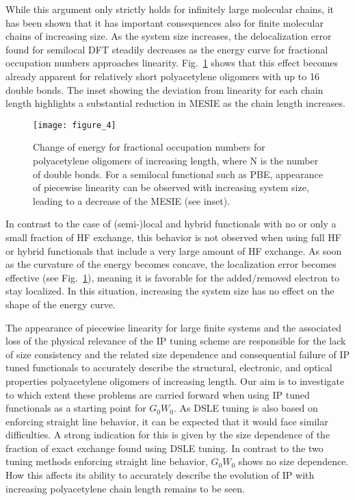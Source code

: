\documentclass[journal=jctcce,manuscript=article,layout=twocolumn]{achemso}
\begin{document}
While this argument only strictly holds for infinitely large molecular chains, it has been shown that it has important consequences also for finite molecular chains of increasing size. As the system size increases, the delocalization
error found for semilocal DFT steadily decreases as the energy curve for fractional occupation numbers approaches linearity.\cite{phys_rev_let_2008_piecewise_linearity_finite_infinite,jcp_2015_piecewise_linearity_solid_state_finite}  Fig.~\ref{MESIE_frac} shows that this effect becomes already apparent for 
relatively short polyacetylene oligomers with up to 16 double bonds. The inset showing the deviation from linearity for each chain length highlights a substantial reduction in MESIE as the chain length increases.
\begin{figure}[tb]
\texttt{[image: figure\_4]}
\caption{Change of energy for fractional occupation numbers for polyacetylene oligomers of increasing length, where N is the number of double bonds. For a semilocal functional such as PBE, appearance of piecewise
linearity can be observed with increasing system size, leading to a decrease of the MESIE (see inset).\label{MESIE_frac}}
\end{figure}
In contrast to the case of (semi-)local and hybrid functionals with no or only a small fraction of HF exchange, this behavior is not observed when using full HF or hybrid functionals that include a very large amount of HF exchange. As soon as the curvature of the energy becomes concave, the localization error becomes effective (see Fig.~\ref{MESIE_frac}), meaning it is favorable for the added/removed electron to stay localized. In this situation, increasing the system size has no effect on the shape of the energy curve.\cite{phys_rev_let_2008_piecewise_linearity_finite_infinite}

The appearance of piecewise linearity for large finite systems and the associated loss of the physical relevance of the IP tuning scheme are responsible for the lack of size consistency and the related size dependence and consequential
failure of IP tuned functionals to accurately describe the structural, electronic, and optical properties polyacetylene oligomers of increasing length. Our aim is to investigate to which extent these problems are carried forward when using IP tuned functionals as a starting point for $G_0W_0$.
As DSLE tuning is also based on enforcing straight line behavior, it can be expected that it would face similar difficulties. A strong indication for this is given by the 
size dependence of the fraction of exact exchange found using DSLE tuning. 
In contrast to the two tuning methods enforcing straight line behavior, $G_0W_0$ shows no size dependence. How this affects its ability to accurately describe the evolution of IP with increasing polyacetylene chain length
remains to be seen. 
\end{document}
